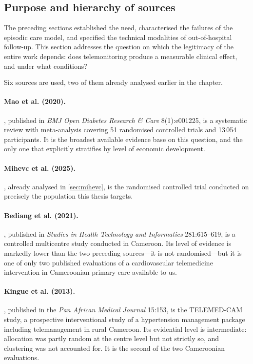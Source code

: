 \documentclass[12pt,a4paper,oneside]{report}
\begin{document}
\subsection*{Purpose and hierarchy of sources}

The preceding sections established the need, characterised the failures of the episodic care model, and specified the technical modalities of out-of-hospital follow-up. This section addresses the question on which the legitimacy of the entire work depends: does telemonitoring produce a measurable clinical effect, and under what conditions?

Six sources are used, two of them already analysed earlier in the chapter.

\paragraph{Mao et al. (2020).} \textcite{mao2020}, published in \emph{BMJ Open Diabetes Research \& Care} 8(1):e001225, is a systematic review with meta-analysis covering 51 randomised controlled trials and 13\,054 participants. It is the broadest available evidence base on this question, and the only one that explicitly stratifies by level of economic development.

\paragraph{Mihevc et al. (2025).} \textcite{mihevc2025}, already analysed in \cref{sec:mihevc}, is the randomised controlled trial conducted on precisely the population this thesis targets.

\paragraph{Bediang et al. (2021).} \textcite{bediang2021}, published in \emph{Studies in Health Technology and Informatics} 281:615--619, is a controlled multicentre study conducted in Cameroon. Its level of evidence is markedly lower than the two preceding sources---it is not randomised---but it is one of only two published evaluations of a cardiovascular telemedicine intervention in Cameroonian primary care available to us.

\paragraph{Kingue et al. (2013).} \textcite{kingue2013}, published in the \emph{Pan African Medical Journal} 15:153, is the TELEMED-CAM study, a prospective interventional study of a hypertension management package including telemanagement in rural Cameroon. Its evidential level is intermediate: allocation was partly random at the centre level but not strictly so, and clustering was not accounted for. It is the second of the two Cameroonian evaluations.
\end{document}
